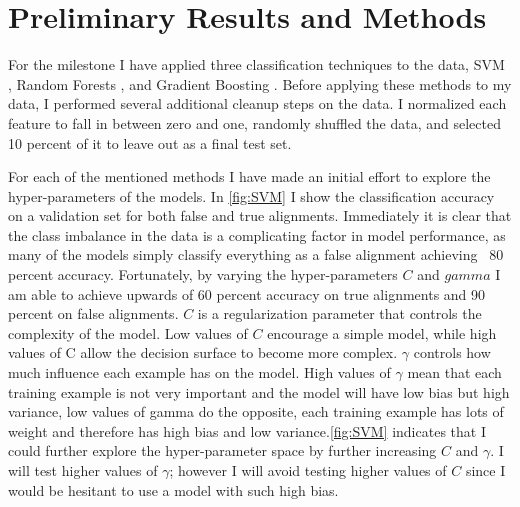 \documentclass{article}
\begin{document}
\section*{Preliminary Results and Methods}
For the milestone I have applied three classification techniques to the data, SVM \parencite{Hastie2008}, Random Forests \parencite{Ho1995, Breiman2001}, and Gradient Boosting \parencite{Friedman1999GreedyMachine}. \parencite{Pedregosa2011Scikit-learnPython} Before applying these methods to my data, I performed several additional cleanup steps on the data. I normalized each feature to fall in between zero and one, randomly shuffled the data, and selected 10 percent of it to leave out as a final test set. 

For each of the mentioned methods I have made an initial effort to explore the hyper-parameters of the models. In \autoref{fig:SVM} I show the classification accuracy on a validation set for both false and true alignments. Immediately it is clear that the class imbalance in the data is a complicating factor in model performance, as many of the models simply classify everything as a false alignment achieving ~80 percent accuracy. Fortunately, by varying the hyper-parameters $C$ and $gamma$ I am able to achieve upwards of 60 percent accuracy on true alignments and 90 percent on false alignments. $C$ is a regularization parameter that controls the complexity of the model. Low values of $C$ encourage a simple model, while high values of C allow the decision surface to become more complex. $\gamma$ controls how much influence each example has on the model. High values of $\gamma$ mean that each training example is not very important and the model will have low bias but high variance, low values of gamma do the opposite, each training example has lots of weight and therefore has high bias and low variance.\autoref{fig:SVM} indicates that I could further explore the hyper-parameter space by further increasing $C$ and $\gamma$. I will test higher values of $\gamma$; however I will avoid testing higher values of $C$ since I would be hesitant to use a model with such high bias. 
\end{document}
